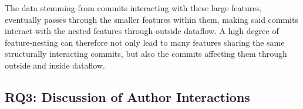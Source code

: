 The data stemming from commits interacting with these large features, eventually passes through the smaller features within them, making said commits interact with the nested features through outside dataflow.
A high degree of feature-nesting can therefore not only lead to many features sharing the same structurally interacting commits, but also the commits affecting them through outside and inside dataflow.

\subsection*{\textbf{RQ3: Discussion of Author Interactions}}\label{sec:disc_author_interactions}

